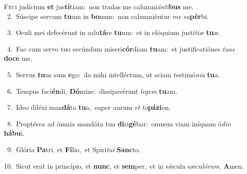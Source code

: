 \lettrine{\initial\textcolor{\initialcolor}{F}}{eci} judícium \textbf{et} jus\-\textbf{tí}\-tiam:~\star non tradas me calumni\-\textit{án}\-\textit{ti}\textbf{bus} me.\\
{\numbfont\textcolor{\numbcolor}{~2.}}~Súscipe servum \textbf{tu}\-um in \textbf{bo}\-num:~\star non calumniéntur \textit{me} \textit{su}\-\textbf{pér}bi.\par
{\numbfont\textcolor{\numbcolor}{~3.}}~Oculi mei defecérunt in salu\-\textbf{tá}\-re \textbf{tu}\-um:~\star et in elóquium justí\-\textit{ti}\-\textit{æ} \textbf{tu}\-æ.\par
{\numbfont\textcolor{\numbcolor}{~4.}}~Fac cum servo tuo secúndum miseri\-\textbf{cór}\-diam \textbf{tu}\-am:~\star et justificatiónes \textit{tu}\-\textit{as} \textbf{do}\-\textbf{ce} me.\par
{\numbfont\textcolor{\numbcolor}{~5.}}~Servus \textbf{tu}\-us sum \textbf{e}\-go:~\star da mihi intelléctum, ut sciam testimó\-\textit{ni}\-\textit{a} \textbf{tu}\-a.\par
{\numbfont\textcolor{\numbcolor}{~6.}}~Tempus faci\-\textbf{én}\-di, \textbf{Dó}\-mine:~\star dissipavérunt \textit{le}\-\textit{gem} \textbf{tu}\-am.\par
{\numbfont\textcolor{\numbcolor}{~7.}}~Ideo diléxi man\-\textbf{dá}\-ta \textbf{tu}\-a,~\star super aurum \textit{et} \textit{to}\-\textbf{pá}\textbf{zi}on.\par
{\numbfont\textcolor{\numbcolor}{~8.}}~Proptérea ad ómnia mandáta tua \textbf{di}\-ri\-\textbf{gé}\-bar:~\star omnem viam iníquam ó\-\textit{di}\-\textit{o} \textbf{há}\-\textbf{bu}i.\par
{\numbfont\textcolor{\numbcolor}{~9.}}~Glória \textbf{Pa}\-tri, et \textbf{Fí}\-lio,~\star et Spirí\-\textit{tu}\-\textit{i} \textbf{Sanc}\-to.\par
{\numbfont\textcolor{\numbcolor}{10.}}~Sicut erat in princípio, et \textbf{nunc}\-, et \textbf{sem}\-per,~\star et in sǽcula sæcu\-\textit{ló}\-\textit{rum}. \textbf{A}\-men.\par
